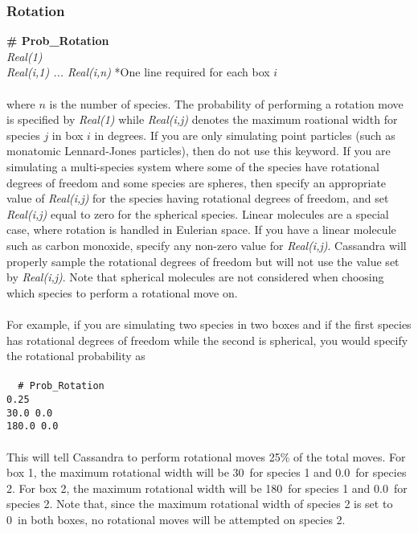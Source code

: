 \subsubsection{Rotation}
{\bf \# Prob\_Rotation}\\
{\it Real(1)} \\
{\it Real(i,1) ... Real(i,n)} *One line required for each box $i$ \\ \\
%
where $n$ is the number of species.
The probability of performing a rotation move is specified by 
{\it Real(1)} while {\it Real(i,j)} denotes the maximum roational width
for  species $j$ in  box $i$ in degrees. If you are only
simulating point particles (such as monatomic Lennard-Jones particles), then
do not use this keyword. If you are simulating a multi-species system
where some of the species have rotational degrees of freedom and some
species are spheres, then specify an appropriate value of 
{\it  Real(i,j)} for the species having rotational degrees of freedom, and
set {\it Real(i,j)} equal to zero for the spherical species. Linear
molecules are a special case, where rotation is handled in Eulerian
space. If you have a linear molecule such as carbon monoxide, specify
any non-zero value for {\it Real(i,j)}. Cassandra will properly sample
the rotational degrees of freedom but will not use the value set by
{\it Real(i,j)}. Note that spherical molecules are not considered when
choosing which species to perform a rotational move on.
\\ \\
For example, if you are simulating two species in two boxes and if the first species has rotational degrees
of freedom while the second is spherical, you would specify
the rotational probability as \\ \\
\texttt{
{ \# Prob\_Rotation} \\
 0.25 \\
30.0 0.0\\
180.0 0.0} \\
\\ 
%
This will tell Cassandra to perform rotational moves 25\% of the total moves. For box 1,
the maximum rotational width will be 30\degree\ for species 1 and 0.0\degree\
for species 2. For box 2, the maximum rotational width will be 180\degree\ for
species 1 and 0.0\degree\ for species 2. Note that, since the maximum rotational
 width of species 2 is set to 0\degree\ in both boxes, no rotational moves will be
 attempted on species 2. \\ \\
